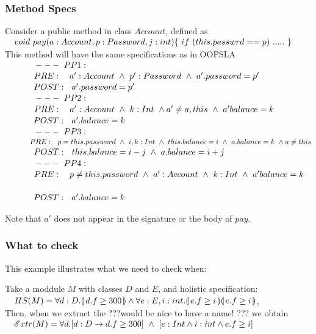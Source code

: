 \subsubsection{Method Specs}

\newcommand{\SP}{~\strut \ \ \ \ \ \ \ \ \ }
Consider a public method in class $Account$, defined as \\
$\strut \ \ \  void\  pay(a: Account, p:Password, j: int)\{ \ if\ ( this.passwrd== p)\ .....\  \}$
\\
This method will have the same specifications as in OOPSLA\\ 
$\SP---\ PP1:$\\
$\SP PRE:\ \ \ a': Account \ \wedge \  p' : Password \ \wedge \ a'.password=p' $
\\
$\SP POST: \ \ a'.password=p' $
\\
$\SP ---\ PP2:$\\
$\SP PRE:\ \ \ a':Account \ \wedge\ k: Int \ \wedge  a'\neq a, this\ \wedge\  a'balance = k \ \ $\\
$\SP POST:\ \   a'.balance = k \ \ $
\\
$\SP ---\ PP3:$ \\
$\SP PRE: \ \ p=this.password \ \wedge\ i,k:Int \ \wedge \ this.balance=i \ \wedge \ a.balance=k\ \wedge a\neq this$
\\
$\SP POST:\ \  this.balance=i-j \ \wedge\  a.balance = i+j \ \ $\\
$\SP ---\ PP4:$\\
$\SP PRE:\ \ \  p\neq this.password\  \wedge \  a':Account \ \wedge\ k: Int\   \wedge\  a'balance = k $\\
\\
$\SP POST: \ \ a'.balance=k$

Note that $a'$ does not appear in the signature or the body of $pay$.

\subsubsection{What to check}
This example illustrates what we need to check when:

Take a moddule $M$ with classes $D$ and $E$, and holistic specification:\\
$\strut \ \ \  HS(M)= \forall {d:D}.{\llparenthesis}\, d.f\geq 300 \,{\rrparenthesis} \wedge  \forall {e:E,i:int}.{\llparenthesis}\, e.f\geq i \,{\rrparenthesis}{\llparenthesis}\, e.f\geq i \,{\rrparenthesis} $,\\
Then, when we extract the ???would be nice to have a name! ??? we obtain\\
$\strut \ \ \   {\mathcal E}xtr(M)  = \forall d.[d:D \rightarrow d.f\geq 300]\ \wedge \  [ e:Int \wedge i:int \wedge e.f \geq i]$

